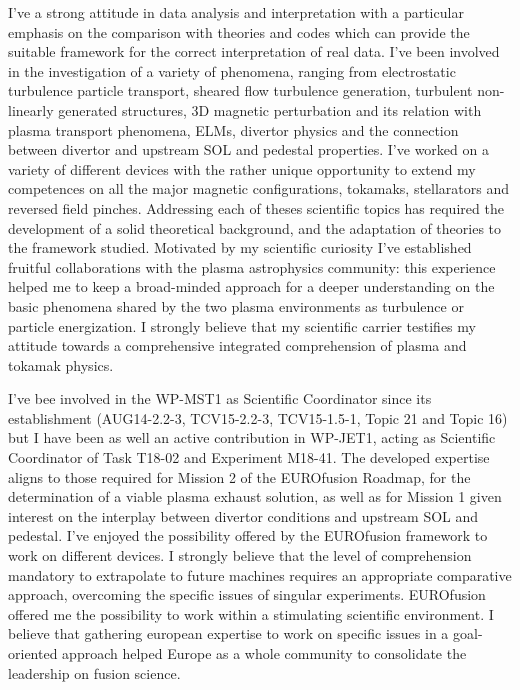 \documentclass[12pt,a4paper,sans]{moderncv}        %
\begin{document}
I've a strong attitude in
data analysis and interpretation with a particular emphasis on the
comparison with theories and codes which can provide the suitable framework for the
correct interpretation of real data. I've been involved in
the investigation of a variety of phenomena, ranging from electrostatic
turbulence particle transport, sheared flow turbulence generation,
turbulent non-linearly generated structures, 3D
magnetic perturbation and its relation with plasma transport phenomena, ELMs, divertor
physics and the connection between divertor and upstream SOL and
pedestal properties. I've worked on a variety of different
devices with the rather unique opportunity to extend my competences
on all the major magnetic configurations, tokamaks,  stellarators and
reversed field pinches. Addressing each of theses scientific 
topics has required the development of a solid theoretical
background, and the adaptation of theories to the framework
studied. Motivated by my scientific curiosity I've established
fruitful collaborations with the plasma astrophysics community: this
experience helped me to keep a broad-minded approach for a deeper understanding on the basic 
phenomena shared by the two plasma environments as turbulence or particle energization. 
I strongly believe that my scientific carrier testifies my 
attitude towards a comprehensive integrated comprehension of plasma and tokamak physics. 

I've bee involved in the WP-MST1 as Scientific Coordinator since
its establishment (AUG14-2.2-3, TCV15-2.2-3, TCV15-1.5-1, Topic 21 and
Topic 16) but I have been as well an active contribution in WP-JET1, acting as Scientific Coordinator
of Task T18-02 and Experiment M18-41. The developed expertise aligns
to those required for Mission 2 of the EUROfusion Roadmap, for the
determination of a viable plasma exhaust solution, as well as
for Mission 1 given interest on the interplay between divertor
conditions and upstream SOL and pedestal. 
I've enjoyed the
possibility offered by the EUROfusion framework to work on
different devices. I strongly believe that the level of
comprehension mandatory to extrapolate to future
machines requires an appropriate comparative approach, overcoming the
specific issues of singular experiments.
EUROfusion offered me the possibility to work within a stimulating
scientific environment. I believe that gathering
european expertise to work on specific issues in a
goal-oriented approach helped Europe as a whole community to
consolidate the leadership on fusion science.
\end{document}
